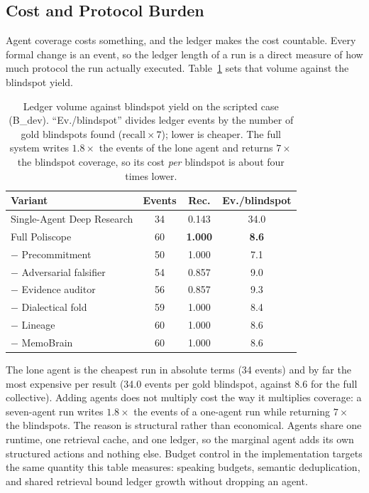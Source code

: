 \subsection{Cost and Protocol Burden}

Agent coverage costs something, and the ledger makes the cost countable.
Every formal change is an event, so the ledger length of a run is a direct
measure of how much protocol the run actually executed. Table~\ref{tab:cost}
sets that volume against the blindspot yield.

\begin{table}[t]
\centering
\small
\begin{tabular}{@{}lccc@{}}
\toprule
\textbf{Variant} & \textbf{Events} & \textbf{Rec.} & \textbf{Ev./blindspot} \\
\midrule
Single-Agent Deep Research & 34 & 0.143 & 34.0 \\
Full Poliscope & 60 & \textbf{1.000} & \textbf{8.6} \\
\quad$-$ Precommitment & 50 & 1.000 & 7.1 \\
\quad$-$ Adversarial falsifier & 54 & 0.857 & 9.0 \\
\quad$-$ Evidence auditor & 56 & 0.857 & 9.3 \\
\quad$-$ Dialectical fold & 59 & 1.000 & 8.4 \\
\quad$-$ Lineage & 60 & 1.000 & 8.6 \\
\quad$-$ MemoBrain & 60 & 1.000 & 8.6 \\
\bottomrule
\end{tabular}
\caption{Ledger volume against blindspot yield on the scripted case
(B\_dev). ``Ev./blindspot'' divides ledger events by the number of gold
blindspots found ($\mathrm{recall}\times 7$); lower is cheaper. The full
system writes $1.8\times$ the events of the lone agent and returns
$7\times$ the blindspot coverage, so its cost \emph{per} blindspot is about
four times lower.}
\label{tab:cost}
\end{table}

The lone agent is the cheapest run in absolute terms (34 events) and
by far the most expensive per result (34.0 events per gold blindspot,
against 8.6 for the full collective). Adding agents does not multiply cost the
way it multiplies coverage: a seven-agent run writes $1.8\times$ the events
of a one-agent run while returning $7\times$ the blindspots. The reason is
structural rather than economical. Agents share one runtime, one retrieval
cache, and one ledger, so the marginal agent adds its own structured actions
and nothing else. Budget control in the implementation targets the same
quantity this table measures: speaking budgets, semantic deduplication, and
shared retrieval bound ledger growth without dropping an agent.

